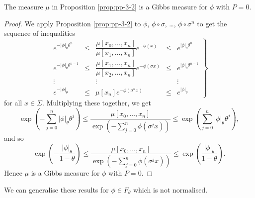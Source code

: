 \begin{corollary} \label{cor:pp-3-2-1}
	The measure $\mu$ in Proposition \ref{prop:pp-3-2} is a Gibbs measure for $\phi$ with $P = 0$.
	\begin{proof}
		We apply Proposition \ref{prop:pp-3-2} to $\phi$, $\phi \circ \sigma$, \dots, $\phi \circ \sigma^n$ to get the sequence of inequalities
		\[
			\left.
			\begin{matrix}
				e^{-|\phi|_\theta \theta^n} &\leq& \dfrac{\mu[x_0, \dots, x_n]}{\mu[x_1, \dots, x_n]} e^{-\phi(x)} &\leq& e^{|\phi|_\theta \theta^n} \\
				e^{-|\phi|_\theta \theta^{n - 1}} &\leq& \dfrac{\mu[x_1, \dots, x_n]}{\mu[x_2, \dots, x_n]} e^{-\phi(\sigma{x})} &\leq& e^{|\phi|_\theta \theta^{n - 1}} \\
				\vdots & & \vdots & & \vdots \\
				e^{-|\phi|_\theta} &\leq& \mu[x_n] e^{-\phi(\sigma^n{x})} &\leq& e^{|\phi|_\theta}
			\end{matrix}
			\right\}
		\]
		for all $x \in \Sigma$. Multiplying these together, we get
		\[
			\exp\left(-\sum_{j = 0}^n{|\phi|_\theta \theta^j}\right) \leq \frac{\mu[x_0, \dots, x_n]}{\exp\left(-\sum_{j = 0}^n{\phi(\sigma^j{x})}\right)} \leq \exp\left(\sum_{j = 0}^n{|\phi|_\theta \theta^j}\right),
		\]
		and so
		\[
			\exp\left(-\frac{|\phi|_\theta}{1 - \theta}\right) \leq \frac{\mu[x_0, \dots, x_n]}{\exp\left(-\sum_{j = 0}^n{\phi(\sigma^j{x})}\right)} \leq \exp\left(\frac{|\phi|_\theta}{1 - \theta}\right).
		\]
		Hence $\mu$ is a Gibbs measure for $\phi$ with $P = 0$.
	\end{proof}
\end{corollary}

We can generalise these results for $\phi \in F_\theta$ which is not normalised.

